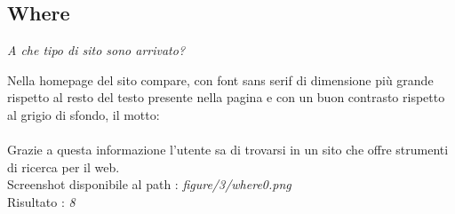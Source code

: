 \subsection{Where}\label{where}
\begin{center}

\textit{A che tipo di sito sono arrivato?}

\end{center}
\begin{flushleft}
Nella homepage del sito compare, con font sans serif di dimensione
più grande rispetto al resto del testo presente nella pagina e con un buon
contrasto rispetto al grigio di sfondo, il motto: \\
 \\
Grazie a questa informazione l'utente sa di trovarsi in un sito che offre
strumenti di ricerca per il web. \\
Screenshot disponibile al path : \textit{figure/3/where0.png} \\
Risultato : \textit{8}
\end{flushleft}